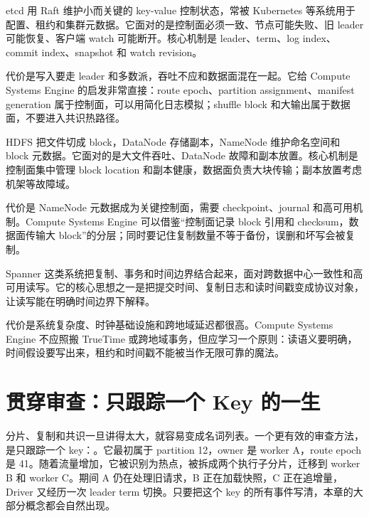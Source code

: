 \begin{casebox}
etcd 用 Raft 维护小而关键的 key-value 控制状态，常被 Kubernetes 等系统用于配置、租约和集群元数据。它面对的是控制面必须一致、节点可能失败、旧 leader 可能恢复、客户端 watch 可能断开。核心机制是 leader、term、log index、commit index、snapshot 和 watch revision。

代价是写入要走 leader 和多数派，吞吐不应和数据面混在一起。它给 Compute Systems Engine 的启发非常直接：route epoch、partition assignment、manifest generation 属于控制面，可以用简化日志模拟；shuffle block 和大输出属于数据面，不要进入共识热路径。
\end{casebox}

\begin{casebox}
HDFS 把文件切成 block，DataNode 存储副本，NameNode 维护命名空间和 block 元数据。它面对的是大文件吞吐、DataNode 故障和副本放置。核心机制是控制面集中管理 block location 和副本健康，数据面负责大块传输；副本放置考虑机架等故障域。

代价是 NameNode 元数据成为关键控制面，需要 checkpoint、journal 和高可用机制。Compute Systems Engine 可以借鉴“控制面记录 block 引用和 checksum，数据面传输大 block”的分层；同时要记住复制数量不等于备份，误删和坏写会被复制。
\end{casebox}

\begin{casebox}
Spanner 这类系统把复制、事务和时间边界结合起来，面对跨数据中心一致性和高可用读写。它的核心思想之一是把提交时间、复制日志和读时间戳变成协议对象，让读写能在明确时间边界下解释。

代价是系统复杂度、时钟基础设施和跨地域延迟都很高。Compute Systems Engine 不应照搬 TrueTime 或跨地域事务，但应学习一个原则：读语义要明确，时间假设要写出来，租约和时间戳不能被当作无限可靠的魔法。
\end{casebox}

\section{贯穿审查：只跟踪一个 Key 的一生}

分片、复制和共识一旦讲得太大，就容易变成名词列表。一个更有效的审查方法，是只跟踪一个 key：。它最初属于 partition 12，owner 是 worker A，route epoch 是 41。随着流量增加，它被识别为热点，被拆成两个执行子分片，迁移到 worker B 和 worker C。期间 A 仍在处理旧请求，B 正在加载快照，C 正在追增量，Driver 又经历一次 leader term 切换。只要把这个 key 的所有事件写清，本章的大部分概念都会自然出现。

